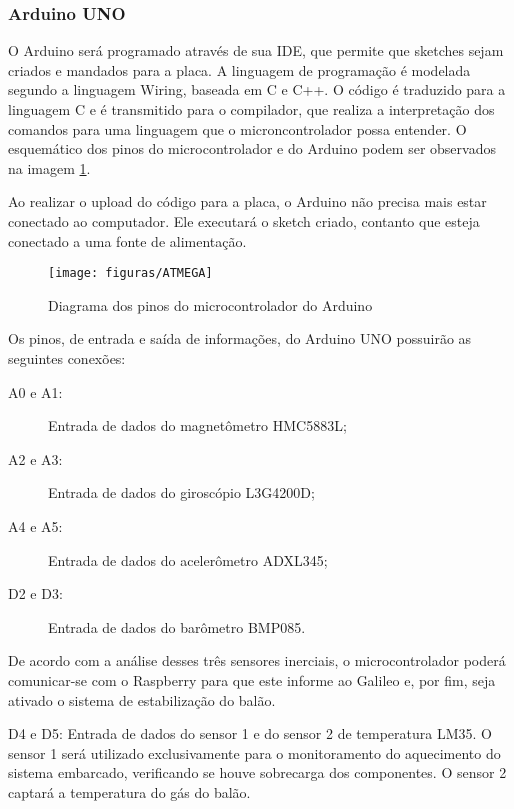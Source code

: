 	\subsubsection{Arduino UNO}

		O Arduino será programado através de sua IDE, que permite que sketches sejam criados e mandados para a placa. A linguagem de programação é modelada segundo a linguagem Wiring, baseada em C e C++. O código é traduzido para a linguagem C e é transmitido para o compilador, que realiza a interpretação dos comandos para uma linguagem que o microncontrolador possa entender. O esquemático dos pinos do microcontrolador e do Arduino podem ser observados na imagem \ref{img:atmega}.

		Ao realizar o upload do código para a placa, o Arduino não precisa mais estar conectado ao computador. Ele executará o sketch criado, contanto que esteja conectado a uma fonte de alimentação.~\cite{embarcados1}

		\begin{figure}[H]
		  \centering
		  \caption[Diagrama dos pinos do microcontrolador do Arduino]{Diagrama dos pinos do microcontrolador do Arduino~\cite{embarcados2}}
		  \label{img:atmega}
		  \texttt{[image: figuras/ATMEGA]}
		\end{figure}

		Os pinos, de entrada e saída de informações, do Arduino UNO possuirão as seguintes conexões:
		\begin{description}
			\item[A0 e A1:] Entrada de dados do magnetômetro HMC5883L;
			\item[A2 e A3:] Entrada de dados do giroscópio L3G4200D;
			\item[A4 e A5:] Entrada de dados do acelerômetro ADXL345;
			\item[D2 e D3:] Entrada de dados do barômetro BMP085.
		\end{description}

		De acordo com a análise desses três sensores inerciais, o microcontrolador poderá comunicar-se com o Raspberry para que este informe ao Galileo e, por fim, seja ativado o sistema de estabilização do balão.

		D4 e D5: Entrada de dados do sensor 1 e do sensor 2 de temperatura LM35. O sensor 1 será utilizado exclusivamente para o monitoramento do aquecimento do sistema embarcado, verificando se houve sobrecarga dos componentes. O sensor 2 captará a temperatura do gás do balão.

